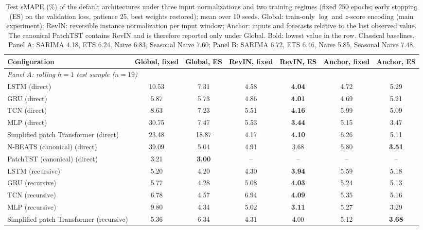 \begin{table}[htbp]
\centering
\caption{Test sMAPE (\%) of the default architectures under three input normalizations and two training regimes (fixed 250 epochs; early stopping (ES) on the validation loss, patience 25, best weights restored); mean over 10 seeds. Global: train-only $\log$ and $z$-score encoding (main experiment); RevIN: reversible instance normalization per input window; Anchor: inputs and forecasts relative to the last observed value. The canonical PatchTST contains RevIN and is therefore reported only under Global. Bold: lowest value in the row. Classical baselines, Panel A: SARIMA 4.18, ETS 6.24, Naive 6.83, Seasonal Naive 7.60; Panel B: SARIMA 6.72, ETS 6.46, Naive 5.85, Seasonal Naive 7.48.}
\label{tab:r3_factorial}
\vspace{4pt}
\small
\begin{adjustbox}{max width=\textwidth}
\begin{tabular}{lcccccc}
\toprule
\textbf{Configuration} & Global, fixed & Global, ES & RevIN, fixed & RevIN, ES & Anchor, fixed & Anchor, ES \\
\midrule
\multicolumn{7}{l}{\textit{Panel A: rolling $h=1$ test sample ($n=19$)}} \\
\addlinespace
LSTM (direct) & 10.53 & 7.31 & 4.58 & \textbf{4.04} & 4.72 & 5.29 \\
GRU (direct) & 5.87 & 5.73 & 4.86 & \textbf{4.01} & 4.69 & 5.21 \\
TCN (direct) & 8.63 & 7.23 & 5.51 & \textbf{4.16} & 5.99 & 5.09 \\
MLP (direct) & 30.75 & 7.47 & 5.53 & \textbf{3.44} & 5.15 & 3.47 \\
Simplified patch Transformer (direct) & 23.48 & 18.87 & 4.17 & \textbf{4.10} & 6.26 & 5.11 \\
N-BEATS (canonical) (direct) & 39.09 & 5.04 & 4.91 & 3.68 & 5.80 & \textbf{3.51} \\
PatchTST (canonical) (direct) & 3.21 & \textbf{3.00} & -- & -- & -- & -- \\
\addlinespace
LSTM (recursive) & 5.20 & 4.20 & 4.30 & \textbf{3.94} & 5.59 & 5.18 \\
GRU (recursive) & 5.77 & 4.28 & 5.08 & \textbf{4.03} & 5.24 & 5.13 \\
TCN (recursive) & 6.78 & 4.57 & 6.94 & \textbf{4.09} & 5.35 & 5.16 \\
MLP (recursive) & 9.80 & 4.34 & 5.02 & \textbf{3.11} & 5.27 & 3.29 \\
Simplified patch Transformer (recursive) & 5.36 & 6.34 & 4.31 & 4.00 & 5.12 & \textbf{3.68} \\

\end{tabular}
\end{adjustbox}
\end{table}
